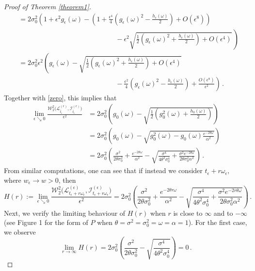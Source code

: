 \documentclass[12pt,thmsa]{article}
\begin{document}
\begin{proof}[Proof of Theorem \ref{theorem1}]
\[\begin{split}
		&=2\sigma^2_0\left(1+\epsilon^2 g_\epsilon(\omega)-\left(1+\frac{\epsilon^4}{4}\left( g_\epsilon(\omega)^2-\frac{h_\epsilon(\omega)}{2}\right)+O(\epsilon^8)\right)\right.\\
		&\left.\hspace{6cm}- \epsilon^2\sqrt{ \frac{1}{2}\left(  g_\epsilon(\omega)^2+\frac{h_\epsilon(\omega)}{2}\right) +O(\epsilon^4)}\,\right)\\ 
		&=2\sigma^2_0\epsilon^2\left(g_\epsilon(\omega)- \sqrt{ \frac{1}{2}\left( g_\epsilon(\omega)^2+\frac{h_\epsilon(\omega)}{2}\right) +O(\epsilon^4)} \right.\\
		&\left.\hspace{6cm}- \frac{\epsilon^2}{4}\left( g_\epsilon(\omega)^2-\frac{h_\epsilon(\omega)}{2}\right) +\frac{O(\epsilon^8)}{\epsilon^2}\right)\,. 
	\end{split} 
	\]
	Together with \eqref{zero}, this implies that 
	\[
	\begin{split}
		\lim_{\epsilon\searrow0}\frac{\mathcal{W}^2_2\Big(\mathcal{L}^{(\epsilon)}_{\overline{t}_\epsilon},\mathcal{I}^{(\epsilon)}_{\overline{t}_\epsilon}\Big)}{\epsilon^2}&=2\sigma^2_0\left(g_0(\omega)-\sqrt{\frac{1}{2}\left(g^2_0(\omega)+\frac{h_0(\omega)}{2}\right)}\right)\\
		&=2\sigma^2_0\left(g_0(\omega)-\sqrt{g^2_0(\omega)-g_0(\omega)\frac{e^{-2\theta \omega}}{\alpha^2}}\right)\\
		&=2\sigma^2_0\left(\frac{\sigma^2}{2\theta\sigma_0^2}+ \frac{e^{-2\theta \omega}}{\alpha^2}-\sqrt{\frac{\sigma^4}{4\theta^2\sigma_0^4 }+\frac{\sigma^2e^{-2\theta \omega}}{2\theta\sigma_0^2\alpha^2}}\right)\,.
	\end{split}
	\]
	From  similar computations, one can see that if instead we consider  $t_\epsilon+r\omega_\epsilon,$ 
	where $w_\epsilon\to w>0$,  then
	$$H(r):=\lim_{\epsilon\searrow0}\frac{\mathcal{W}^2_2\Big(\mathcal{L}^{(\epsilon)}_{t_\epsilon+r\omega_\epsilon},\mathcal{I}^{(\epsilon)}_{t_\epsilon+r\omega_\epsilon}\Big)}{\epsilon^2}=2\sigma^2_0\left(\frac{\sigma^2}{2\theta\sigma_0^2}+ \frac{e^{-2\theta r\omega}}{\alpha^2}-\sqrt{\frac{\sigma^4}{4\theta^2\sigma_0^4 }+\frac{\sigma^2 e^{-2r\theta \omega}}{2\theta\sigma_0^2\alpha^2}}\right)\,.$$ 
	Next, we verify the limiting behaviour of  $H(r)$ when $r$ is close to $\infty$ and to $-\infty$ (see Figure 1 for the form of $P$ when $\theta=\sigma^2=\sigma_0^2=\omega=\alpha=1$). For the first case, we observe
	$$\lim_{r\to\infty}H(r)=2\sigma^2_0\left(\frac{\sigma^2}{2\theta\sigma_0^2}-\sqrt{\frac{\sigma^4}{4\theta^2\sigma_0^4 }}\right)=0\,.$$

\end{proof}
\end{document}
